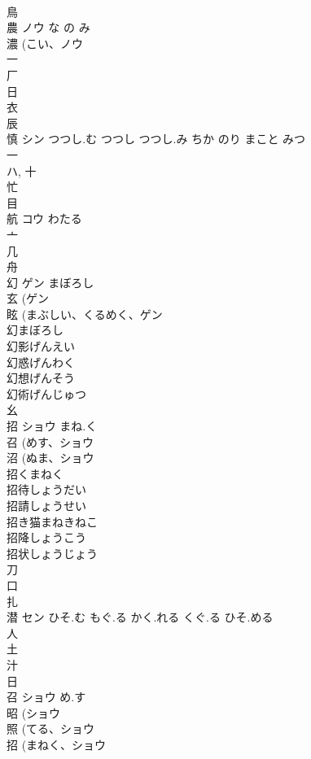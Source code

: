 \documentclass[8pt]{extreport}
\begin{document}
\begin{CJK}{UTF8}{min}
\\	鳥 
\\	農	ノウ	な の み	
\\	濃 (こい、ノウ 
\\	一 
\\	厂 
\\	日 
\\	衣 
\\	辰 
\\	慎	シン	つつし.む つつし つつし.み ちか のり まこと みつ	
\\	一 
\\	ハ, 十 
\\	忙 
\\	目 
\\	航	コウ	わたる	
\\	亠 
\\	几 
\\	舟 
\\	幻	ゲン	まぼろし	
\\	玄 (ゲン 
\\	眩 (まぶしい、くるめく、ゲン 
\\	幻まぼろし
\\	幻影げんえい
\\	幻惑げんわく
\\	幻想げんそう
\\	幻術げんじゅつ
\\	幺 
\\	招	ショウ	まね.く	
\\	召 (めす、ショウ 
\\	沼 (ぬま、ショウ 
\\	招くまねく
\\	招待しょうだい
\\	招請しょうせい
\\	招き猫まねきねこ
\\	招降しょうこう
\\	招状しょうじょう
\\	刀 
\\	口 
\\	扎	
\\	潜	セン	ひそ.む もぐ.る かく.れる くぐ.る ひそ.める	
\\	人 
\\	土 
\\	汁 
\\	日 
\\	召	ショウ	め.す	
\\	昭 (ショウ 
\\	照 (てる、ショウ 
\\	招 (まねく、ショウ 

\end{CJK}
\end{document}
